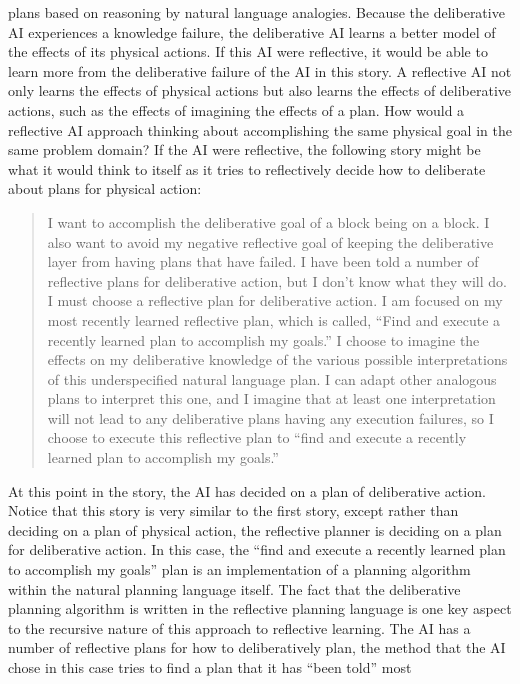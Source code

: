 plans based on reasoning by natural language analogies.  Because the
deliberative AI experiences a knowledge failure, the deliberative AI
learns a better model of the effects of its physical actions.  If this
AI were reflective, it would be able to learn more from the
deliberative failure of the AI in this story.  A reflective AI not
only learns the effects of physical actions but also learns the
effects of deliberative actions, such as the effects of imagining the
effects of a plan.  How would a reflective AI approach thinking about
accomplishing the same physical goal in the same problem domain?  If
the AI were reflective, the following story might be what it would
think to itself as it tries to reflectively decide how to deliberate
about plans for physical action:
\begin{quote}
  I want to accomplish the deliberative goal of a block being on a
  block.  I also want to avoid my negative reflective goal of keeping
  the deliberative layer from having plans that have failed.  I have
  been told a number of reflective plans for deliberative action, but
  I don't know what they will do.  I must choose a reflective plan for
  deliberative action.  I am focused on my most recently learned
  reflective plan, which is called, ``Find and execute a recently
  learned plan to accomplish my goals.''  I choose to imagine the
  effects on my deliberative knowledge of the various possible
  interpretations of this underspecified natural language plan.  I can
  adapt other analogous plans to interpret this one, and I imagine
  that at least one interpretation will not lead to any deliberative
  plans having any execution failures, so I choose to execute this
  reflective plan to ``find and execute a recently learned plan to
  accomplish my goals.''
\end{quote}
At this point in the story, the AI has decided on a plan of
deliberative action.  Notice that this story is very similar to the
first story, except rather than deciding on a plan of physical action,
the reflective planner is deciding on a plan for deliberative action.
In this case, the ``find and execute a recently learned plan to
accomplish my goals'' plan is an implementation of a planning
algorithm within the natural planning language itself.  The fact that
the deliberative planning algorithm is written in the reflective
planning language is one key aspect to the recursive nature of this
approach to reflective learning.  The AI has a number of reflective
plans for how to deliberatively plan, the method that the AI chose in
this case tries to find a plan that it has ``been told'' most
